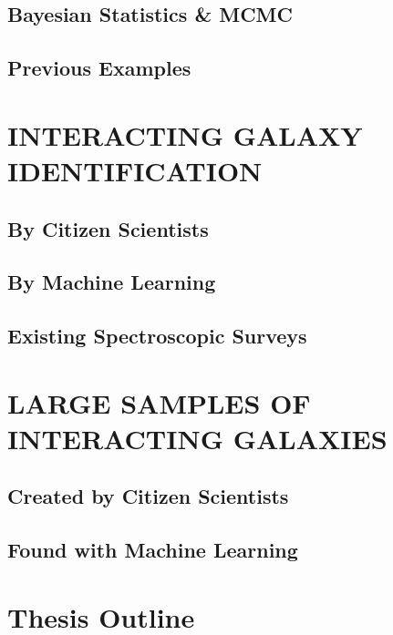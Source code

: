 \subsection{Bayesian Statistics \& MCMC}

\subsection{Previous Examples}

\section{INTERACTING GALAXY IDENTIFICATION}

\subsection{By Citizen Scientists}

\subsection{By Machine Learning}

\subsection{Existing Spectroscopic Surveys}


\section{LARGE SAMPLES OF INTERACTING GALAXIES}
\subsection{Created by Citizen Scientists}
\subsection{Found with Machine Learning}
\section{Thesis Outline}

